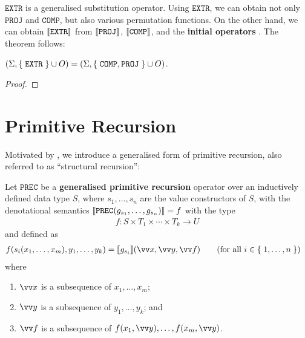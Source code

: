 $\mathtt{EXTR}$ is a generalised substitution operator. Using $\mathtt{EXTR}$,
we can obtain not only $\mathtt{PROJ}$ and $\mathtt{COMP}$, but also various
permutation functions.  On the other hand, we can obtain ${\mathopen{}\left\llbracket{\mathtt{EXTR}}\right\rrbracket\mathclose{}}$
from ${\mathopen{}\left\llbracket{\mathtt{PROJ}}\right\rrbracket\mathclose{}}$, ${\mathopen{}\left\llbracket{\mathtt{COMP}}\right\rrbracket\mathclose{}}$, and the {\bfseries
\color{red} initial operators} \cite{rose-1984}. The theorem follows:


\begin{theorem}\label{thm:extr-comp-proj} ${\mathopen{}\left({\Sigma,\mathopen{}\left\{\mathrel{}{\mathtt{EXTR}}\mathrel{}\right\}\mathclose{} \cup
O}\right)\mathclose{}} = {\mathopen{}\left({\Sigma,\mathopen{}\left\{\mathrel{}{\mathtt{COMP}, \mathtt{PROJ}}\mathrel{}\right\}\mathclose{} \cup O}\right)\mathclose{}}$. \end{theorem}

\begin{proof}  \end{proof}

\section{Primitive Recursion}

\label{sec:primitive-recursion}

Motivated by \cite{leivant-1995}, we introduce a generalised form of primitive
recursion, also referred to as ``structural recursion''\cite{hofmann-2002}:


\begin{definition} Let $\mathtt{PREC}$ be a \textbf{generalised primitive
recursion} operator over an inductively defined data type $S$, where
$s_1,\ldots,s_n$ are the value constructors of $S$, with the denotational
semantics ${\mathopen{}\left\llbracket{\mathtt{PREC}{\ensuremath{\mathopen{}\left({g_{s_1},\ldots,g_{s_n}}\right)\mathclose{}}}}\right\rrbracket\mathclose{}} = f$ with the
type\begin{align*}
%
f : S \times T_1 \times \cdots \times T_k \rightarrow U
%
\end{align*}and defined as\begin{align*}
%
f\p{s_i\p{x_1,\ldots,x_m},y_1,\ldots,y_k} = \sem{g_{s_i}}\p{\vect{x}, \vect{y},
\vect{f}} & \quad \quad \p{\text{for all $i \in \set{1, \ldots, n}$}}
%
\end{align*} where

\begin{enumerate}

\item $\vect{x}$ is a subsequence of $x_1,\ldots,x_m$;

\item $\vect{y}$ is a subsequence of $y_1,\ldots,y_k$; and

\item $\vect{f}$ is a subsequence of $f\p{x_1, \vect{y}},\ldots, f\p{x_m,
\vect{y}}$.

\end{enumerate}

\end{definition}

